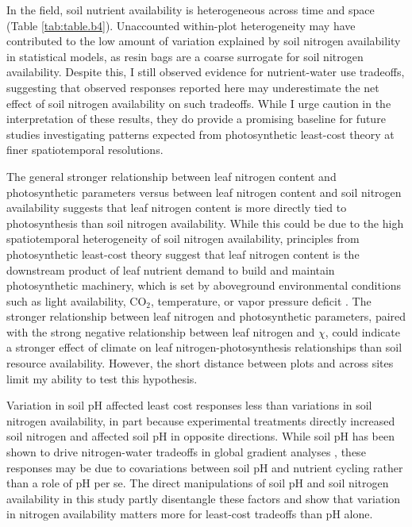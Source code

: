 In the field, soil nutrient availability is heterogeneous across time and space (Table \ref{tab:table.b4}). Unaccounted within-plot heterogeneity may have contributed to the low amount of variation explained by soil nitrogen availability in statistical models, as resin bags are a coarse surrogate for soil nitrogen availability. Despite this, I still observed evidence for nutrient-water use tradeoffs, suggesting that observed responses reported here may underestimate the net effect of soil nitrogen availability on such tradeoffs. While I urge caution in the interpretation of these results, they do provide a promising baseline for future studies investigating patterns expected from photosynthetic least-cost theory at finer spatiotemporal resolutions.
    
The general stronger relationship between leaf nitrogen content and photosynthetic parameters versus between leaf nitrogen content and soil nitrogen availability suggests that leaf nitrogen content is more directly tied to photosynthesis than soil nitrogen availability. While this could be due to the high spatiotemporal heterogeneity of soil nitrogen availability, principles from photosynthetic least-cost theory suggest that leaf nitrogen content is the downstream product of leaf nutrient demand to build and maintain photosynthetic machinery, which is set by aboveground environmental conditions such as light availability, CO$_2$, temperature, or vapor pressure deficit . The stronger relationship between leaf nitrogen and photosynthetic parameters, paired with the strong negative relationship between leaf nitrogen and $\chi$, could indicate a stronger effect of climate on leaf nitrogen-photosynthesis relationships than soil resource availability. However, the short distance between plots and across sites limit my ability to test this hypothesis.
    
Variation in soil pH affected least cost responses less than variations in soil nitrogen availability, in part because experimental treatments directly increased soil nitrogen and affected soil pH in opposite directions. While soil pH has been shown to drive nitrogen-water tradeoffs in global gradient analyses , these responses may be due to covariations between soil pH and nutrient cycling rather than a role of pH per se. The direct manipulations of soil pH and soil nitrogen availability in this study partly disentangle these factors and show that variation in nitrogen availability matters more for least-cost tradeoffs than pH alone.

